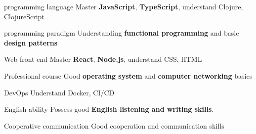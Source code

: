 

\begin{cvskills}

\cvskill
   {programming language} %
   {Master \textbf{JavaScript}, \textbf{TypeScript}, understand Clojure, ClojureScript} %

\cvskill
{programming paradigm} %
{Understanding \textbf{functional programming} and basic \textbf{design patterns}} %

\cvskill
   {Web front end} %
   {Master \textbf{React}, \textbf{Node.js}, understand CSS, HTML} %

\cvskill
   {Professional course} %
   {Good \textbf{operating system} and \textbf{computer networking} basics} %
  
\cvskill
     {DevOps} %
     {Understand Docker, CI/CD} %

\cvskill
   {English ability} %
   {Possess good \textbf{English listening and writing skills}. } %

\cvskill
   {Cooperative communication} %
   {Good cooperation and communication skills} %

\end{cvskills}
